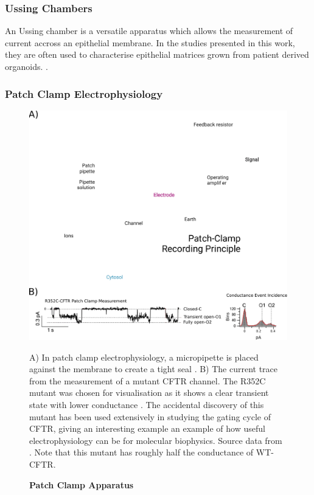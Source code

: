 \subsubsection{Ussing Chambers}
An Ussing chamber is a versatile apparatus which allows the measurement of current accross an epithelial membrane. In the studies presented in this work, they are often used to characterise epithelial matrices grown from patient derived organoids. .

\subsubsection{Patch Clamp Electrophysiology}
\begin{figure}
	\label{patch_clamp}
	\begin{center}
	\includegraphics[width=1\textwidth]{figures/R352C_ephys_measurement_figure.pdf}
	\end{center}
	\captionsetup{singlelinecheck = false, justification=raggedright}
	\caption[Patch Clamp Apparatus] {\textbf{Patch Clamp Apparatus}}{A) In patch clamp electrophysiology, a micropipette is placed against the membrane to create a tight seal \cite{patch_clamp_recording_principal_figure}. B) The current trace from the measurement of a mutant CFTR channel. The R352C mutant was chosen for visualisation as it shows a clear transient state with lower conductance \cite{jih2012}. The accidental discovery of this mutant has been used extensively in studying the gating cycle of CFTR, giving an interesting example an example of how useful electrophysiology can be for molecular biophysics. Source data from \cite{jih2012}. Note that this mutant has roughly half the conductance of WT-CFTR.} 
\end{figure}
